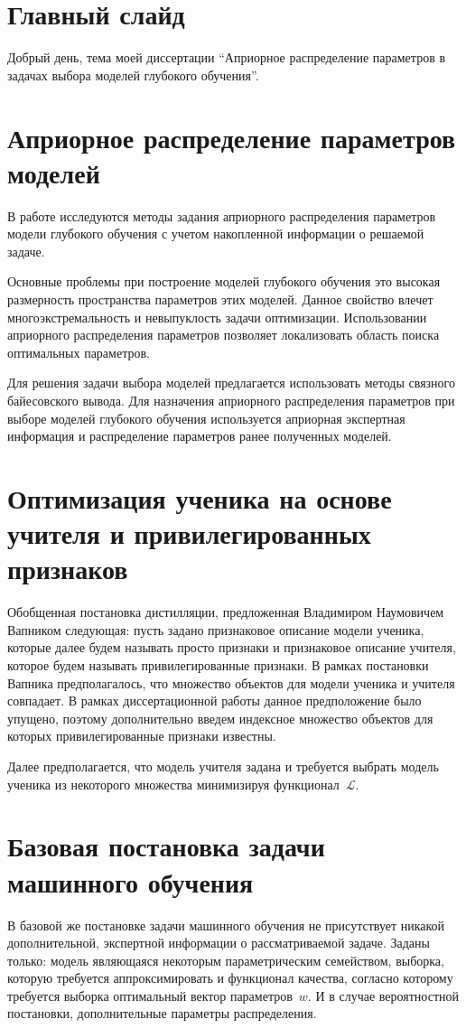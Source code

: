 \documentclass[10pt, twoside]{article}
\begin{document}
\section{Главный слайд}
Добрый день, тема моей диссертации ``Априорное распределение параметров в задачах выбора моделей глубокого обучения''.

\section{Априорное распределение параметров моделей}
В работе исследуются методы задания априорного распределения параметров модели глубокого обучения с учетом накопленной информации о решаемой задаче.

Основные проблемы при построение моделей глубокого обучения это высокая размерность пространства параметров этих моделей. Данное свойство влечет многоэкстремальность и невыпуклость задачи оптимизации. Использовании априорного распределения параметров позволяет локализовать область поиска оптимальных параметров.

Для решения задачи выбора моделей предлагается использовать методы связного байесовского вывода. Для назначения априорного распределения параметров при выборе моделей глубокого обучения используется априорная экспертная информация и распределение параметров ранее полученных моделей.

\section{Оптимизация ученика на основе учителя и привилегированных признаков}
Обобщенная постановка дистилляции, предложенная Владимиром Наумовичем Вапником следующая: пусть задано признаковое описание модели ученика, которые далее будем называть просто признаки и признаковое описание учителя, которое будем называть привилегированные признаки. В рамках постановки Вапника предполагалось, что множество объектов для модели ученика и учителя совпадает. В рамках диссертационной работы данное предположение было упущено, поэтому дополнительно введем индексное множество объектов для которых привилегированные признаки известны.

Далее предполагается, что модель учителя задана и требуется выбрать модель ученика из некоторого множества минимизируя функционал~$\mathcal{L}$.

\section{Базовая постановка задачи машинного обучения}
В базовой же постановке задачи машинного обучения не присутствует никакой дополнительной, экспертной информации о рассматриваемой задаче. Заданы только: модель являющаяся некоторым параметрическим семейством, выборка, которую требуется аппроксимировать и функционал качества, согласно которому требуется выборка оптимальный вектор параметров~$w.$ И в случае вероятностной постановки, дополнительные параметры распределения.
\end{document}
